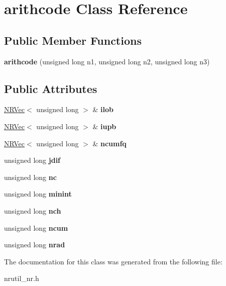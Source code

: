 \hypertarget{classarithcode}{}\section{arithcode Class Reference}
\label{classarithcode}
\subsection*{Public Member Functions}
\begin{DoxyCompactItemize}
\item 
\mbox{\label{classarithcode_a3440b8d7a8b101681bc386f982bd92cb}} 
{\bfseries arithcode} (unsigned long n1, unsigned long n2, unsigned long n3)
\end{DoxyCompactItemize}
\subsection*{Public Attributes}
\begin{DoxyCompactItemize}
\item 
\mbox{\label{classarithcode_ac9a044ea0598b6f648ad4870f33d9d18}} 
\hyperlink{class_n_r_vec}{N\+R\+Vec}$<$ unsigned long $>$ \& {\bfseries ilob}
\item 
\mbox{\label{classarithcode_af7c423f14a05b50f4f8dd656fa3660cc}} 
\hyperlink{class_n_r_vec}{N\+R\+Vec}$<$ unsigned long $>$ \& {\bfseries iupb}
\item 
\mbox{\label{classarithcode_ae1966ac0bde27c0ada1bc025632054e6}} 
\hyperlink{class_n_r_vec}{N\+R\+Vec}$<$ unsigned long $>$ \& {\bfseries ncumfq}
\item 
\mbox{\label{classarithcode_a271bde4d35b6613bdcae4060007221fd}} 
unsigned long {\bfseries jdif}
\item 
\mbox{\label{classarithcode_a7c5f805d81735fb362c8bb317753737c}} 
unsigned long {\bfseries nc}
\item 
\mbox{\label{classarithcode_a34e73f5416ac3d861722215a987c3554}} 
unsigned long {\bfseries minint}
\item 
\mbox{\label{classarithcode_ad687412f244bd2ed9daf154934a1594c}} 
unsigned long {\bfseries nch}
\item 
\mbox{\label{classarithcode_af5af3b7b8db9b90a1038d97c30c5bdf9}} 
unsigned long {\bfseries ncum}
\item 
\mbox{\label{classarithcode_a01f26d81945f369b49a532a419c9e4e2}} 
unsigned long {\bfseries nrad}
\end{DoxyCompactItemize}


The documentation for this class was generated from the following file\+:\begin{DoxyCompactItemize}
\item 
nrutil\+\_\+nr.\+h\end{DoxyCompactItemize}
